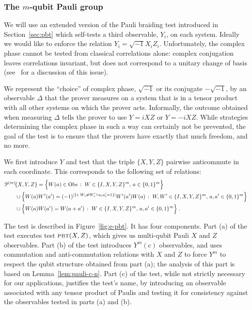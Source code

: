 \subsubsection{The \texorpdfstring{$m$}{m}-qubit Pauli group}
\label{sec:e-pbt}

We will use an extended version of the Pauli braiding test introduced in Section~\ref{sec:pbt} which self-tests a third observable, $Y_i$, on each system. Ideally we would like to enforce the relation $Y_i=\sqrt{-1}X_iZ_i$. Unfortunately, the complex phase cannot be tested from classical correlations alone: complex conjugation leaves correlations invariant, but does not correspond to a unitary change of basis  (see~\cite[Appendix A]{reichardt2012classicalarxiv} for a discussion of this issue). 

We represent the ``choice'' of complex phase, $\sqrt{-1}$ or its conjugate $-\sqrt{-1}$, by an observable $\Delta$ that the prover measures on a system that is in a tensor product with all other systems on which the prover acts. Informally, the outcome obtained when measuring $\Delta$ tells the prover to use $Y = i XZ$ or $Y=-iXZ$. While strategies determining the complex phase in such a way can certainly not be prevented, the goal of the test is to ensure that the provers have exactly that much freedom, and no more. 

We first introduce $Y$ and test that the triple $\{X,Y,Z\}$ pairwise anticommute in each coordinate. This corresponds to the following set of relations: 
\begin{align*}
& {\mathcal{P}^{(m)}\!}\{X,Y,Z\} = \Big\{ W(a)\in\mathrm{Obs}\,:\;W \in \{I,X,Y,Z\}^m,\,a\in\{0,1\}^m\Big\} \\
&\qquad\cup \Big\{W(a)W'(a')=(-1)^{|\{i:\,W_i\neq W'_i \wedge a_ia'_i=1\}|} W'(a')W(a)\,:\;W,W' \in \{I,X,Y,Z\}^m,\,a,a'\in\{0,1\}^m\Big\}\\
&\qquad \cup\Big\{ W(a)W(a')=W(a+a')\,:\;W \in \{I,X,Y,Z\}^m,\,a,a'\in\{0,1\}^m\Big\}\;.
\end{align*}


The test is described in Figure~\ref{fig:e-pbt}. It has four components. Part (a) of the test executes test $\textsc{pbt}(X,Z)$, which gives us multi-qubit Pauli $X$ and $Z$ observables. 
Part (b) of the test introduces $Y^m(c)$ observables, and uses commutation and anti-commutation relations with $X$ and $Z$ to force $Y^m$ to respect the qubit structure obtained from part (a); the analysis of this part is based on Lemma~\ref{lem:pauli-c-n}. Part (c) of the test, while not strictly necessary for our applications, justifies the test's name, by introducing an observable associated with any tensor product of Paulis and testing it for consistency against the observables tested in parts (a) and (b). 

